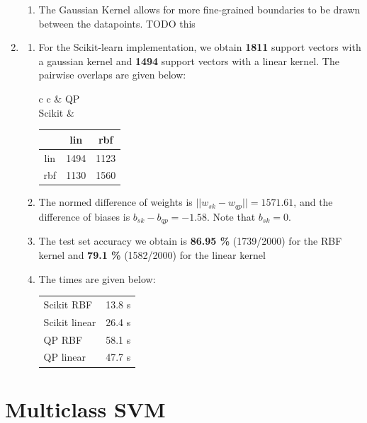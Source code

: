 \documentclass[12pt]{article}
\begin{document}
\begin{enumerate}[label=(\alph*)]
\begin{enumerate}[label=\roman*.]
        \item The Gaussian Kernel allows for more fine-grained boundaries to be drawn between the datapoints. TODO this
    \end{enumerate}

    \item \begin{enumerate}[label=\roman*.]
        \item For the Scikit-learn implementation, we obtain \textbf{1811} support vectors with a gaussian kernel and \textbf{1494} support vectors with a linear kernel. The pairwise overlaps are given below:
        \begin{center}
            \begin{tabular}{c c}
                & QP \\
                Scikit & 
            \begin{tabular}{c|c|c|}
                    & lin  & rbf  \\   
                \hline
                lin & 1494 & 1123 \\
                \hline
                rbf & 1130 & 1560 \\
                \hline
            \end{tabular}
            \end{tabular}
        \end{center}

    \item The normed difference of weights is $||w_{sk} - w_{qp}|| = 1571.61$, and the difference of biases is $b_{sk} - b_{qp} = -1.58$. Note that $b_{sk} = 0$.

    \item The test set accuracy we obtain is \textbf{86.95 \%} (1739/2000) for the RBF kernel and \textbf{79.1 \%} (1582/2000) for the linear kernel

        \item The times are given below:
            \begin{center}
                \begin{tabular}{|l|c|}
                    \hline
                    Scikit RBF & 13.8 s \\
                    Scikit linear & 26.4 s\\
                    QP RBF & 58.1 s\\
                    QP linear & 47.7 s\\
                    \hline
                \end{tabular}
            \end{center}
    \end{enumerate}

\end{enumerate}

\section{Multiclass SVM}
\end{document}
